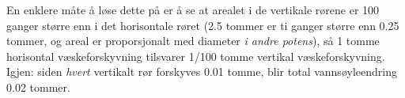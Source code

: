 En enklere måte å løse dette på er å se at arealet i de vertikale rørene er 100 ganger større enn i det horisontale røret (2.5 tommer er ti ganger større enn 0.25 tommer, og areal er proporsjonalt med diameter \textit{i andre potens}), så 1 tomme horisontal væskeforskyvning tilsvarer 1/100 tomme vertikal væskeforskyvning.  Igjen: siden \textit{hvert} vertikalt rør forskyves 0.01 tomme, blir total vannsøyleendring 0.02 tommer.











